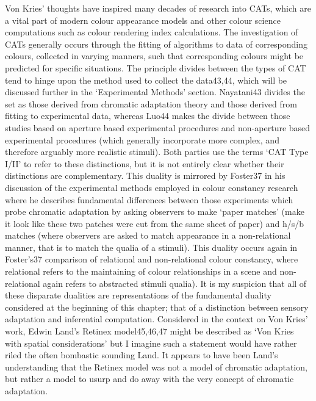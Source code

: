 
Von Kries' thoughts have inspired many decades of research into CATs, which are a vital part of modern colour appearance models and other colour science computations such as colour rendering index calculations. The investigation of CATs generally occurs through the fitting of algorithms to data of corresponding colours, collected in varying manners, such that corresponding colours might be predicted for specific situations. The principle divides between the types of CAT tend to hinge upon the method used to collect the data43,44, which will be discussed further in the `Experimental Methods' section. Nayatani43 divides the set as those derived from chromatic adaptation theory and those derived from fitting to experimental data, whereas Luo44 makes the divide between those studies based on aperture based experimental procedures and non-aperture based experimental procedures (which generally incorporate more complex, and therefore arguably more realistic stimuli). Both parties use the terms `CAT Type I/II' to refer to these distinctions, but it is not entirely clear whether their distinctions are complementary. This duality is mirrored by Foster37 in his discussion of the experimental methods employed in colour constancy research where he describes fundamental differences between those experiments which probe chromatic adaptation by asking observers to make `paper matches' (make it look like these two patches were cut from the same sheet of paper) and h/s/b matches (where observers are asked to match appearance in a non-relational manner, that is to match the qualia of a stimuli). This duality occurs again in Foster's37 comparison of relational and non-relational colour constancy, where relational refers to the maintaining of colour relationships in a scene and non-relational again refers to abstracted stimuli qualia). It is my suspicion that all of these disparate dualities are representations of the fundamental duality considered at the beginning of this chapter; that of a distinction between sensory adaptation and inferential computation.
Considered in the context on Von Kries' work, Edwin Land's Retinex model45,46,47 might be described as `Von Kries with spatial considerations' but I imagine such a statement would have rather riled the often bombastic sounding Land. It appears to have been Land's understanding that the Retinex model was not a model of chromatic adaptation, but rather a model to usurp and do away with the very concept of chromatic adaptation.
